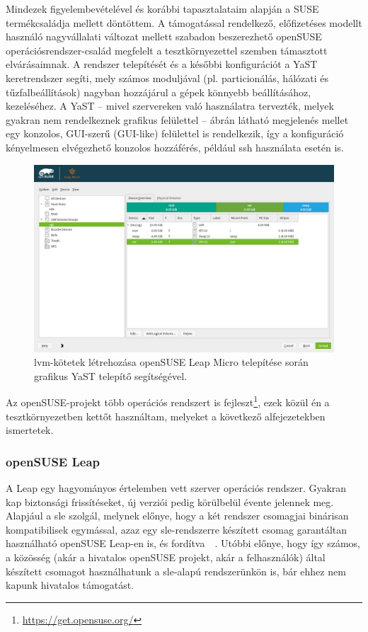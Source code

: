 Mindezek figyelembevételével és korábbi tapasztalataim alapján a SUSE termékcsaládja mellett döntöttem. A támogatással rendelkező, előfizetéses modellt használó nagyvállalati változat mellett szabadon beszerezhető openSUSE operációsrendszer-család megfelelt a tesztkörnyezettel szemben támasztott elvárásaimnak. A rendszer telepítését és a későbbi konfigurációt a YaST keretrendszer segíti, mely számos moduljával (pl. particionálás, hálózati és tűzfalbeállítások) nagyban hozzájárul a gépek könnyebb beállításához, kezeléséhez. A YaST -- mivel szervereken való használatra tervezték, melyek gyakran nem rendelkeznek grafikus felülettel --  ábrán látható megjelenés mellet egy konzolos, GUI-szerű (GUI-like) felülettel is rendelkezik, így a konfiguráció kényelmesen elvégezhető konzolos hozzáférés, például \acrshort{ssh} használata esetén is.

\begin{figure}[!ht]
	\centering
	\includegraphics[width=15cm]{figures/yast-partitioner.png}
	\caption{\acrshort{lvm}-kötetek létrehozása openSUSE Leap Micro telepítése során grafikus YaST telepítő segítségével.}
	\label{fig:yast-partitioner}
\end{figure}

Az openSUSE-projekt több operációs rendszert is fejleszt\footnote{\url{https://get.opensuse.org/}}, ezek közül én a tesztkörnyezetben kettőt használtam, melyeket a következő alfejezetekben ismertetek.

\subsubsection{openSUSE Leap}
A Leap egy hagyományos értelemben vett szerver operációs rendszer. Gyakran kap biztonsági frissítéseket, új verziói pedig körülbelül évente jelennek meg. Alapjául a \acrlong{sle} szolgál, melynek előnye, hogy a két rendszer csomagjai binárisan kompatibilisek egymással, azaz egy \acrshort{sle}-rendszerre készített csomag garantáltan használható openSUSE Leap-en is, és fordítva~\cite{openSUSELeap15SP3intro}~\cite{SLE15SP3intro}. Utóbbi előnye, hogy így számos, a közösség (akár a hivatalos openSUSE projekt, akár a felhasználók) által készített csomagot használhatunk a \acrshort{sle}-alapú rendszerünkön is, bár ehhez nem kapunk hivatalos támogatást.

